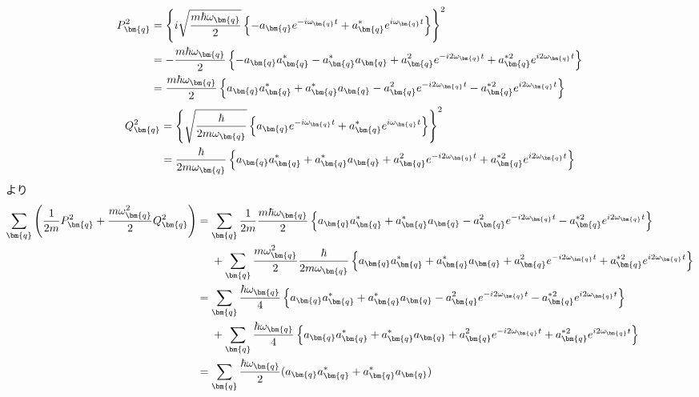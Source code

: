 \documentclass[dvipdfmx, 11pt, a4paper]{jsarticle}
\numberwithin{equation}{section}
\theoremstyle{definition}
\begin{document}
    \begin{derivationBox}
        \begin{align}
            P_{\bm{q}}^2 &= \left\{ i\sqrt{\frac{m\hbar \omega_{\bm{q}}}{2}} \left\{ -a_{\bm{q}}e^{-i\omega_{\bm{q}}t} + a_{\bm{q}}^* e^{i\omega_{\bm{q}}t} \right\} \right\}^2 \notag \\
            &= - \frac{m\hbar \omega_{\bm{q}}}{2} \left\{ -a_{\bm{q}}a_{\bm{q}}^* -a_{\bm{q}}^*a_{\bm{q}} + a_{\bm{q}}^2 e^{-i2\omega_{\bm{q}}t} + a_{\bm{q}}^{*2} e^{i2\omega_{\bm{q}}t} \right\} \notag \\
            &=  \frac{m\hbar \omega_{\bm{q}}}{2} \left\{ a_{\bm{q}}a_{\bm{q}}^* +a_{\bm{q}}^*a_{\bm{q}} - a_{\bm{q}}^2 e^{-i2\omega_{\bm{q}}t} - a_{\bm{q}}^{*2} e^{i2\omega_{\bm{q}}t} \right\}
        \end{align}
        \begin{align}
            Q_{\bm{q}}^2 &= \left\{ \sqrt{\frac{\hbar}{2m\omega_{\bm{q}}}} \left\{ a_{\bm{q}}e^{-i\omega_{\bm{q}}t} + a_{\bm{q}}^* e^{i\omega_{\bm{q}}t} \right\}  \right\}^2 \notag \\
            &= \frac{\hbar}{2m\omega_{\bm{q}}} \left\{ a_{\bm{q}}a_{\bm{q}}^* +a_{\bm{q}}^*a_{\bm{q}} + a_{\bm{q}}^2 e^{-i2\omega_{\bm{q}}t} + a_{\bm{q}}^{*2} e^{i2\omega_{\bm{q}}t}  \right\}
        \end{align}
        より
        \begin{align}
            \sum_{\bm{q}} \left( \frac{1}{2m}P^2_{\bm{q}} + \frac{m\omega_{\bm{q}}^2}{2}Q_{\bm{q}}^2 \right) &= \sum_{\bm{q}} \frac{1}{2m}\frac{m\hbar \omega_{\bm{q}}}{2} \left\{ a_{\bm{q}}a_{\bm{q}}^* +a_{\bm{q}}^*a_{\bm{q}} - a_{\bm{q}}^2 e^{-i2\omega_{\bm{q}}t} - a_{\bm{q}}^{*2} e^{i2\omega_{\bm{q}}t} \right\} \notag \\
            &\ \ \ \ +\sum_{\bm{q}} \frac{m\omega_{\bm{q}}^2}{2}\frac{\hbar}{2m\omega_{\bm{q}}} \left\{ a_{\bm{q}}a_{\bm{q}}^* +a_{\bm{q}}^*a_{\bm{q}} + a_{\bm{q}}^2 e^{-i2\omega_{\bm{q}}t} + a_{\bm{q}}^{*2} e^{i2\omega_{\bm{q}}t}  \right\} \notag \\
            &= \sum_{\bm{q}}\frac{\hbar \omega_{\bm{q}}}{4} \left\{ a_{\bm{q}}a_{\bm{q}}^* +a_{\bm{q}}^*a_{\bm{q}} - a_{\bm{q}}^2 e^{-i2\omega_{\bm{q}}t} - a_{\bm{q}}^{*2} e^{i2\omega_{\bm{q}}t} \right\} \notag \\
            &\ \ \ \ +\sum_{\bm{q}} \frac{\hbar\omega_{\bm{q}}}{4} \left\{ a_{\bm{q}}a_{\bm{q}}^* +a_{\bm{q}}^*a_{\bm{q}} + a_{\bm{q}}^2 e^{-i2\omega_{\bm{q}}t} + a_{\bm{q}}^{*2} e^{i2\omega_{\bm{q}}t}  \right\} \notag \\
            &= \sum_{\bm{q}} \frac{\hbar \omega_{\bm{q}}}{2}(a_{\bm{q}}a_{\bm{q}}^*   + a_{\bm{q}}^*a_{\bm{q}})
        \end{align}
    \end{derivationBox}
\end{document}
